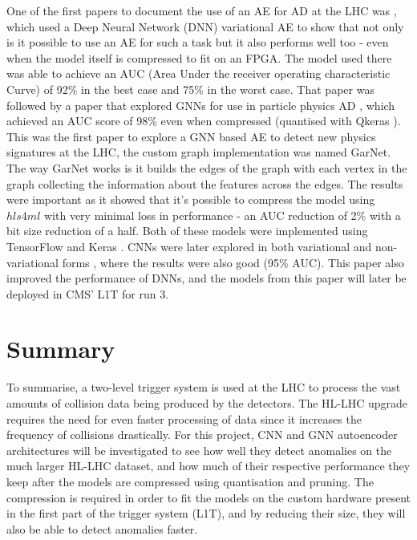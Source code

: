\documentclass[a4paper]{article}
\theoremstyle{plain}
\theoremstyle{definition}
\begin{document}
	One of the first papers to document the use of an AE for AD at the LHC was \cite{vae-2018}, which used a Deep Neural Network (DNN) variational AE to show that not only is it possible to use an AE for such a task but it also performs well too - even when the model itself is compressed to fit on an FPGA. The model used there was able to achieve an AUC (Area Under the receiver operating characteristic Curve) of 92\% in the best case and 75\% in the worst case. That paper was followed by a paper that explored GNNs for use in particle physics AD \cite{garnet}, which achieved an AUC score of 98\% even when compressed (quantised with Qkeras \cite{qkeras}). This was the first paper to explore a GNN based AE to detect new physics signatures at the LHC, the custom graph implementation was named GarNet. The way GarNet works is it builds the edges of the graph with each vertex in the graph collecting the information about the features across the edges. The results were important as it showed that it's possible to compress the model using $hls4ml$ \cite{dnn, hls4ml2} with very minimal loss in performance - an AUC reduction of 2\% with a bit size reduction of a half. Both of these models were implemented using TensorFlow \cite{tensorflow} and Keras \cite{keras}. CNNs were later explored in both variational and non-variational forms \cite{katya}, where the results were also good (95\% AUC). This paper also improved the performance of DNNs, and the models from this paper will later be deployed in CMS' L1T for run 3.
	
	\section{Summary}
	\label{sec:summary}
	
	To summarise, a two-level trigger system is used at the LHC to process the vast amounts of collision data being produced by the detectors. The HL-LHC upgrade requires the need for even faster processing of data since it increases the frequency of collisions drastically. For this project, CNN and GNN autoencoder architectures will be investigated to see how well they detect anomalies on the much larger HL-LHC dataset, and how much of their respective performance they keep after the models are compressed using quantisation and pruning. The compression is required in order to fit the models on the custom hardware present in the first part of the trigger system (L1T), and by reducing their size, they will also be able to detect anomalies faster. 
	
	\newpage
	
	
	\appendix
	
\end{document}
